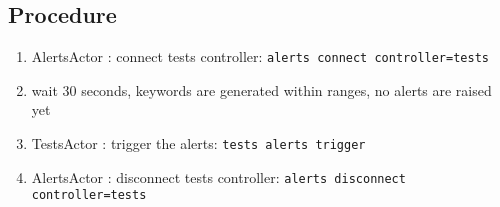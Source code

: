 \subsection{Procedure}
\label{sec:alerts-proc}

\begin{enumerate}
    \item AlertsActor : connect tests controller: \texttt{alerts connect controller=tests}
    \item wait 30 seconds, keywords are generated within ranges, no alerts are raised yet
    \item TestsActor : trigger the alerts: \texttt{tests alerts trigger}
    \item AlertsActor : disconnect tests controller: \texttt{alerts disconnect controller=tests}
\end{enumerate}

